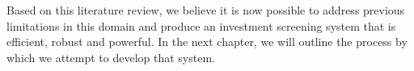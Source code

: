 \documentclass[../thesis/thesis.tex]{subfiles}
\begin{document}
Based on this literature review, we believe it is now possible to address previous limitations in this domain and produce an investment screening system that is efficient, robust and powerful. In the next chapter, we will outline the process by which we attempt to develop that system.

\end{document}
